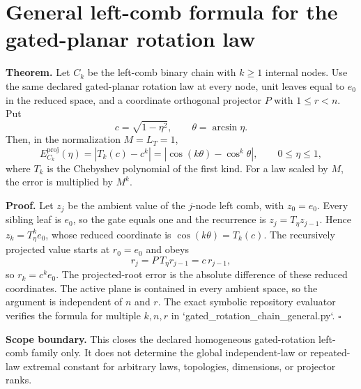 \section*{General left-comb formula for the gated-planar rotation law}
\label{sec:gated-rotation-general-chain}

\textbf{Theorem.} Let $C_k$ be the left-comb binary chain with $k\ge1$
internal nodes. Use the same declared gated-planar rotation law at every
node, unit leaves equal to $e_0$ in the reduced space, and a coordinate
orthogonal projector $P$ with $1\le r<n$. Put
\[
  c=\sqrt{1-\eta^2},\qquad \theta=\arcsin\eta.
\]
Then, in the normalization $M=L_T=1$,
\[
  E_{C_k}^{\mathrm{proj}}(\eta)
  =\left|T_k(c)-c^k\right|
  =\left|\cos(k\theta)-\cos^k\theta\right|,
  \qquad 0\le\eta\le1,
\]
where $T_k$ is the Chebyshev polynomial of the first kind. For a law scaled
by $M$, the error is multiplied by $M^k$.

\textbf{Proof.} Let $z_j$ be the ambient value of the $j$-node left comb,
with $z_0=e_0$. Every sibling leaf is $e_0$, so the gate equals one and
the recurrence is $z_j=T_\eta z_{j-1}$. Hence $z_k=T_\eta^k e_0$, whose
reduced coordinate is $\cos(k\theta)=T_k(c)$. The recursively projected
value starts at $r_0=e_0$ and obeys
\[
  r_j=P\,T_\eta r_{j-1}=c\,r_{j-1},
\]
so $r_k=c^k e_0$. The projected-root error is the absolute difference of
these reduced coordinates. The active plane is contained in every ambient
space, so the argument is independent of $n$ and $r$. The exact symbolic
repository evaluator verifies the formula for multiple $k,n,r$ in
`gated_rotation_chain_general.py`. $\square$

\textbf{Scope boundary.} This closes the declared homogeneous gated-rotation
left-comb family only. It does not determine the global independent-law or
repeated-law extremal constant for arbitrary laws, topologies, dimensions, or
projector ranks.
